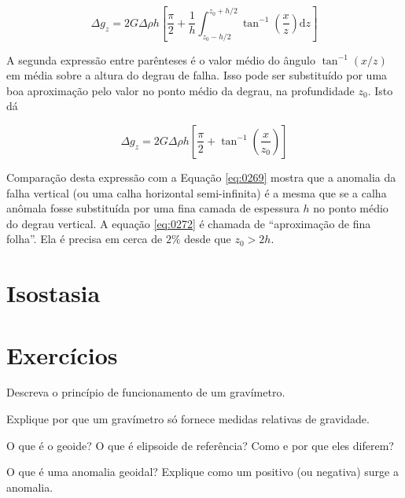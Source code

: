 \documentclass[]{book}
\theoremstyle{definition}
\theoremstyle{definition}
\theoremstyle{definition}
\theoremstyle{remark}
\let\BeginKnitrBlock\begin \let\EndKnitrBlock\end
\begin{document}
\begin{equation}
\Delta g_{z}=2 G \Delta \rho h\left[\frac{\pi}{2}+\frac{1}{h}\int_{z_{0}-h / 2}^{z_{0}+h / 2} \tan ^{-1}\left(\frac{x}{z}\right) \mathrm{d} z\right] \label{eq:0271}
\end{equation}

A segunda expressão entre parênteses é o valor médio do ângulo \(\tan ^{-1}(x / z)\) em média sobre a altura do degrau de falha. Isso pode ser substituído por uma boa aproximação pelo valor no ponto médio da degrau, na profundidade \(z_0\). Isto dá

\begin{equation}
\Delta g_{z}=2 G \Delta \rho h\left[\frac{\pi}{2}+\tan ^{-1}\left(\frac{x}{z_{0}}\right)\right] \label{eq:0272}
\end{equation}

Comparação desta expressão com a Equação \eqref{eq:0269} mostra que a anomalia da falha vertical (ou uma calha horizontal semi-infinita) é a mesma que se a calha anômala fosse substituída por uma fina camada de espessura \(h\) no ponto médio do degrau vertical. A equação \eqref{eq:0272} é chamada de ``aproximação de fina folha''. Ela é precisa em cerca de \(2\%\) desde que \(z_0>2h\).

\hypertarget{isostasia}{%
\section{Isostasia}\label{isostasia}}

\hypertarget{exercicios}{%
\section{Exercícios}\label{exercicios}}

\BeginKnitrBlock{exercise}
\protect\hypertarget{exr:exr1}{}{\label{exr:exr1} } Descreva o princípio de funcionamento de um gravímetro.
\EndKnitrBlock{exercise}

\BeginKnitrBlock{exercise}
\protect\hypertarget{exr:exr2}{}{\label{exr:exr2} }Explique por que um gravímetro só fornece medidas relativas de gravidade.
\EndKnitrBlock{exercise}

\BeginKnitrBlock{exercise}
\protect\hypertarget{exr:exr3}{}{\label{exr:exr3} }O que é o geoide? O que é elipsoide de referência? Como e por que eles diferem?
\EndKnitrBlock{exercise}

\BeginKnitrBlock{exercise}
\protect\hypertarget{exr:exr4}{}{\label{exr:exr4} } O que é uma anomalia geoidal? Explique como um positivo (ou negativa) surge a anomalia.
\EndKnitrBlock{exercise}
\end{document}
